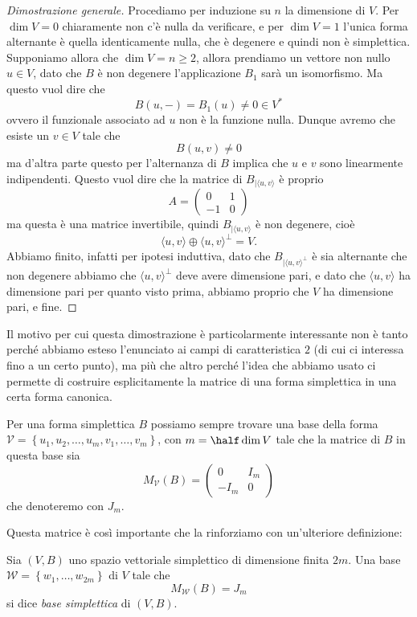 \documentclass[11pt]{scrartcl}
\begin{document}
	\begin{proof}[Dimostrazione generale]
		Procediamo per induzione su $n$ la dimensione di $V$. Per $\dim V=0$ chiaramente non c'è nulla da verificare, e per $\dim V=1$ l'unica forma alternante è quella identicamente nulla, che è degenere e quindi non è simplettica. Supponiamo allora che $\dim V=n\ge 2$, allora prendiamo un vettore non nullo $u\in V$, dato che $B$ è non degenere l'applicazione $B_1$ sarà un isomorfismo. Ma questo vuol dire che
		$$B(u,-)=B_1(u)\ne 0\in V^*$$
		ovvero il funzionale associato ad $u$ non è la funzione nulla. Dunque avremo che esiste un $v\in V$ tale che
		$$B(u,v)\ne 0$$
		ma d'altra parte questo per l'alternanza di $B$ implica che $u$ e $v$ sono linearmente indipendenti. Questo vuol dire che la matrice di $B_{\mid \langle u,v\rangle}$ è proprio
		$$A=\begin{pmatrix}
			0 & 1 \\
			-1 & 0
		\end{pmatrix}$$
		ma questa è una matrice invertibile, quindi $B_{\mid \langle u,v\rangle}$ è non degenere, cioè 
		$$\langle u,v\rangle\oplus \langle  u,v\rangle^\perp = V.$$ 
		Abbiamo finito, infatti per ipotesi induttiva, dato che $B_{\mid \langle u,v \rangle^\perp}$ è sia alternante che non degenere abbiamo che $\langle u,v\rangle^\perp$ deve avere dimensione pari, e dato che $\langle u,v\rangle$ ha dimensione pari per quanto visto prima, abbiamo proprio che $V$ ha dimensione pari, e fine.
	\end{proof}
	Il motivo per cui questa dimostrazione è particolarmente interessante non è tanto perché abbiamo esteso l'enunciato ai campi di caratteristica $2$ (di cui ci interessa fino a un certo punto), ma più che altro perché l'idea che abbiamo usato ci permette di costruire esplicitamente la matrice di una forma simplettica in una certa forma canonica.
	\begin{corollary}
		Per una forma simplettica $B$ possiamo sempre trovare una base della forma $\mathcal{V}=\left\{u_1,u_2,\dots,u_m,v_1,\dots,v_m\right\}$, con $m=\half \dim V$ tale che la matrice di $B$ in questa base sia
		$$M_\mathcal{V}(B)=
		\left(
		\begin{array}{c|c}
			0 & I_m \\
			\hline 
			-I_m& 0
		\end{array}
		\right)
		$$
		che denoteremo con $J_m$.
	\end{corollary}
	Questa matrice è così importante che la rinforziamo con un'ulteriore definizione:
	\begin{definition}
		Sia $(V,B)$ uno spazio vettoriale simplettico di dimensione finita $2m$. Una base $\mathcal{W}=\left\{w_1,\dots,w_{2m}\right\}$ di $V$ tale che 
		$$M_\mathcal{W}(B)=J_m$$
		si dice \textit{base simplettica} di $(V,B)$.
	\end{definition}
\end{document}
